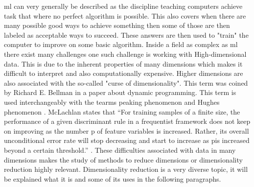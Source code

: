 \gls{ml} can very generally be described as the discipline teaching computers achieve task that where no perfect algorithm is possible. This also covers when there are many possible good ways to achieve something then some of those are then labeled as acceptable ways to succeed. These answers are then used to "train" the computer to improve on some basic algorithm\cite{alpaydin2020introduction}.  Inside a field as complex as \gls{ml} there exist many challenges one such challenge is working with High-dimensional data. This is due to the inherent properties of many dimensions which makes it difficult to interpret and also computationally expensive. Higher dimensions are also associated with the so-called "curse of dimensionality". This term was coined by Richard E. Bellman in a paper about dynamic programming\cite{bellmanrand}. This term is used interchangeably with the tearms peaking phenomenon and Hughes phenomenon \cite{koutroumbas2008pattern} \cite{hughes1968mean}. McLachlan states that
“For training samples of a ﬁnite size, the performance of a given discriminant
rule in a frequentist framework does not keep on improving as the number p
of feature variables is increased. Rather, its overall unconditional error rate
will stop decreasing and start to increase as pis increased beyond a certain
threshold.” \cite{mclachlan2004s100}.
These difficulties associated with data in many dimensions makes the study of methods to reduce dimensions or dimensionality reduction highly relevant. Dimensionality reduction is a very diverse topic, it will be  explained what it is and some of its uses in the following paragraphs.









